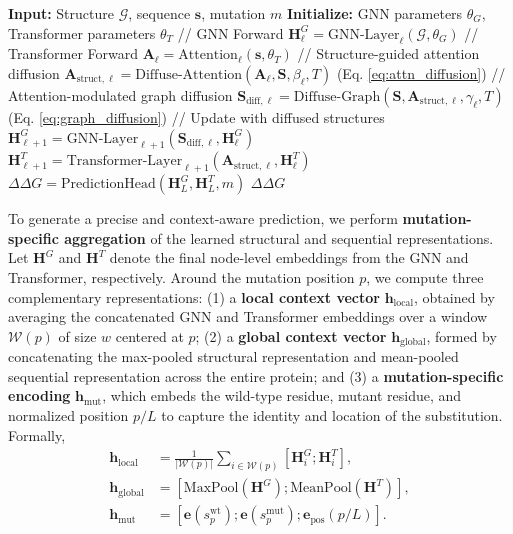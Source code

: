 \documentclass[11pt]{article}
\begin{document}
\begin{algorithm}
\caption{Co-Learning via Bidirectional Diffusion}
\begin{algorithmic}[1]
\STATE \textbf{Input:} Structure $\mathcal{G}$, sequence $\mathbf{s}$, mutation $m$
\STATE \textbf{Initialize:} GNN parameters $\theta_G$, Transformer parameters $\theta_T$
    \STATE // GNN Forward
    \STATE $\mathbf{H}^G_\ell = \text{GNN-Layer}_\ell(\mathcal{G}, \theta_G)$
    \STATE // Transformer Forward  
    \STATE $\mathbf{A}_\ell = \text{Attention}_\ell(\mathbf{s}, \theta_T)$
    \STATE // Structure-guided attention diffusion
    \STATE $\mathbf{A}_{\text{struct}, \ell} = \text{Diffuse-Attention}(\mathbf{A}_\ell, \mathbf{S}, \beta_\ell, T)$ \quad (Eq. \ref{eq:attn_diffusion})
    \STATE // Attention-modulated graph diffusion
    \STATE $\mathbf{S}_{\text{diff}, \ell} = \text{Diffuse-Graph}(\mathbf{S}, \mathbf{A}_{\text{struct}, \ell}, \gamma_\ell, T)$ \quad (Eq. \ref{eq:graph_diffusion})
    \STATE // Update with diffused structures
    \STATE $\mathbf{H}^G_{\ell+1} = \text{GNN-Layer}_{\ell+1}(\mathbf{S}_{\text{diff}, \ell}, \mathbf{H}^G_\ell)$
    \STATE $\mathbf{H}^T_{\ell+1} = \text{Transformer-Layer}_{\ell+1}(\mathbf{A}_{\text{struct}, \ell}, \mathbf{H}^T_\ell)$
\ENDFOR
\STATE $\Delta \Delta G = \text{PredictionHead}(\mathbf{H}^G_L, \mathbf{H}^T_L, m)$
\RETURN $\Delta \Delta G$
\end{algorithmic}
\end{algorithm}




To generate a precise and context-aware prediction, we perform \textbf{mutation-specific aggregation} of the learned structural and sequential representations. Let $\mathbf{H}^G$ and $\mathbf{H}^T$ denote the final node-level embeddings from the GNN and Transformer, respectively. Around the mutation position $p$, we compute three complementary representations: (1) a \textbf{local context vector} $\mathbf{h}_{\text{local}}$, obtained by averaging the concatenated GNN and Transformer embeddings over a window $\mathcal{W}(p)$ of size $w$ centered at $p$; (2) a \textbf{global context vector} $\mathbf{h}_{\text{global}}$, formed by concatenating the max-pooled structural representation and mean-pooled sequential representation across the entire protein; and (3) a \textbf{mutation-specific encoding} $\mathbf{h}_{\text{mut}}$, which embeds the wild-type residue, mutant residue, and normalized position $p/L$ to capture the identity and location of the substitution. Formally,
\begin{align}
    \mathbf{h}_{\text{local}} &= \frac{1}{|\mathcal{W}(p)|} \sum_{i \in \mathcal{W}(p)} [\mathbf{H}^G_i; \mathbf{H}^T_i], \\
    \mathbf{h}_{\text{global}} &= [\text{MaxPool}(\mathbf{H}^G); \text{MeanPool}(\mathbf{H}^T)], \\
    \mathbf{h}_{\text{mut}} &= [\mathbf{e}(s_p^{\text{wt}}); \mathbf{e}(s_p^{\text{mut}}); \mathbf{e}_{\text{pos}}(p/L)].
\end{align}
\end{document}
